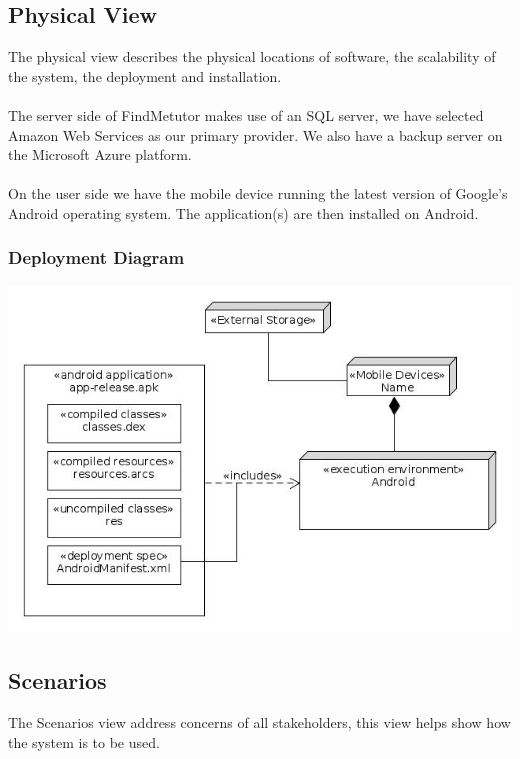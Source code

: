 \documentclass[12pt]{article}
\begin{document}
\newpage

\subsection{Physical View}
The physical view describes the physical locations of software, the scalability of the system, the deployment and installation.
\\\\
The server side of FindMetutor makes use of an SQL server, we have selected Amazon Web Services as our primary provider. We also have a backup server on the Microsoft Azure platform. \\\\
On the user side we have the mobile device running the latest version of Google's Android operating system. The application(s) are then installed on Android.\\
\subsubsection{Deployment Diagram}

\includegraphics[width=140mm]{./Deployment.jpg}

\newpage

\subsection{Scenarios}
The Scenarios view address concerns of all stakeholders, this view helps show how the system is to be used.
\end{document}
